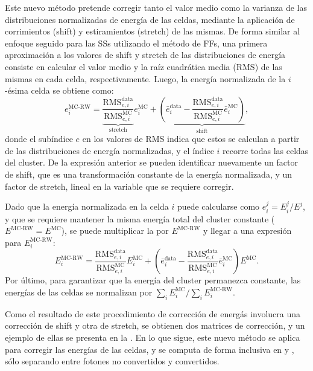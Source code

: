 Este nuevo método pretende corregir tanto el valor medio como la varianza de las distribuciones normalizadas de energía de las celdas, mediante la aplicaci\'on de corrimientos (shift) y estiramientos (stretch) de las mismas. De forma similar al enfoque seguido para las \acp{SS} utilizando el m\'etodo de \acp{FF}, una primera aproximación a los valores de shift y stretch de las distribuciones de energía consiste en calcular el valor medio y la raíz cuadrática media (RMS) de las mismas en cada celda, respectivamente.
Luego, la energía normalizada de la \(i\)-\'esima celda se obtiene como:
\begin{equation}
    \label{eq:ss_corrections:cell_rw:calculation:new:normalized_e}
    e_i^{\text{MC-RW}} =
    \underbrace{\frac{\text{RMS}_{e,i}^{\text{data}}}{\text{RMS}_{e,i}^{\text{MC}}}}_{\text{stretch}} e_i^{\text{MC}}
    +
    \underbrace{\left(\bar e_i^{\text{data}} - \frac{\text{RMS}_{e,i}^{\text{data}}}{\text{RMS}_{e,i}^{\text{MC}}} \bar e_i^{\text{MC}}  \right)}_{\text{shift}},
\end{equation}
donde el subíndice \(e\) en los valores de RMS indica que estos se calculan a partir de las distribuciones de energía normalizadas, y el \'indice \(i\) recorre todas las celdas del cluster. De la expresi\'on anterior se pueden identificar nuevamente un factor de shift, que es una transformaci\'on constante de la energ\'ia normalizada, y un factor de stretch, lineal en la variable que se requiere corregir.

Dado que la energía normalizada en la celda \(i\) puede calcularse como \(e_i^{j} = E_i^{j} / E^{j}\), y que se requiere mantener la misma energía total del cluster constante (\(E^{\text{MC-RW}} = E^{\text{MC}}\)), se puede multiplicar la \Eqn{\ref{eq:ss_corrections:cell_rw:calculation:new:normalized_e}} por \(E^{\text{MC-RW}}\) y llegar a una expresión para \(E_i^{\text{MC-RW}}\):
\begin{equation}
    \label{eq:ss_corrections:cell_rw:calculation:new:correction_method}
    E_i^{\text{MC-RW}} =
    \frac{\text{RMS}_{e,i}^{\text{data}}}{\text{RMS}_{e,i}^{\text{MC}}} E_i^{\text{MC}}
    +
    \left( \bar e_i^{\text{data}} - \frac{\text{RMS}_{e,i}^{\text{data}}}{\text{RMS}_{e,i}^{\text{MC}}} \bar e_i^{\text{MC}} \right) E^{\text{MC}}.
\end{equation}
Por último, para garantizar que la energía del cluster permanezca constante, las energías de las celdas se normalizan por \(\sum_i E_i^{\text{MC}} / \sum_i E_i^{\text{MC-RW}}\).

Como el resultado de este procedimiento de correcci\'on de energ\'as involucra una correcci\'on de shift y otra de stretch, se obtienen dos matrices de correcci\'on, y un ejemplo de ellas se presenta en la \Fig{\ref{fig:ss_corrections:cell_rw:calculation:new:reweights}}.
En lo que sigue, este nuevo método se aplica para corregir las energías de las celdas, y se computa de forma inclusiva en \pt y \abseta, sólo separando entre fotones no convertidos y convertidos.

